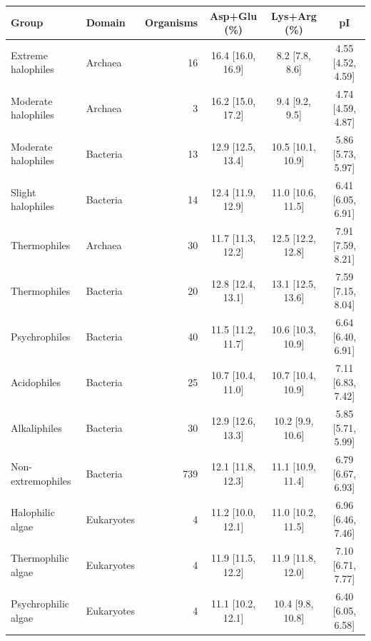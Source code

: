 \begin{tabular}{llrccc}
\hline
\textbf{Group} & \textbf{Domain} & \textbf{Organisms} & \textbf{Asp+Glu (\%)} & \textbf{Lys+Arg (\%)} & \textbf{pI} \\
\hline
Extreme halophiles & Archaea & 16 & 16.4 {\scriptsize[16.0, 16.9]} & 8.2 {\scriptsize[7.8, 8.6]} & 4.55 {\scriptsize[4.52, 4.59]} \\
Moderate halophiles & Archaea & 3 & 16.2 {\scriptsize[15.0, 17.2]} & 9.4 {\scriptsize[9.2, 9.5]} & 4.74 {\scriptsize[4.59, 4.87]} \\
Moderate halophiles & Bacteria & 13 & 12.9 {\scriptsize[12.5, 13.4]} & 10.5 {\scriptsize[10.1, 10.9]} & 5.86 {\scriptsize[5.73, 5.97]} \\
Slight halophiles & Bacteria & 14 & 12.4 {\scriptsize[11.9, 12.9]} & 11.0 {\scriptsize[10.6, 11.5]} & 6.41 {\scriptsize[6.05, 6.91]} \\
\hline
Thermophiles & Archaea & 30 & 11.7 {\scriptsize[11.3, 12.2]} & 12.5 {\scriptsize[12.2, 12.8]} & 7.91 {\scriptsize[7.59, 8.21]} \\
Thermophiles & Bacteria & 20 & 12.8 {\scriptsize[12.4, 13.1]} & 13.1 {\scriptsize[12.5, 13.6]} & 7.59 {\scriptsize[7.15, 8.04]} \\
Psychrophiles & Bacteria & 40 & 11.5 {\scriptsize[11.2, 11.7]} & 10.6 {\scriptsize[10.3, 10.9]} & 6.64 {\scriptsize[6.40, 6.91]} \\
Acidophiles & Bacteria & 25 & 10.7 {\scriptsize[10.4, 11.0]} & 10.7 {\scriptsize[10.4, 10.9]} & 7.11 {\scriptsize[6.83, 7.42]} \\
Alkaliphiles & Bacteria & 30 & 12.9 {\scriptsize[12.6, 13.3]} & 10.2 {\scriptsize[9.9, 10.6]} & 5.85 {\scriptsize[5.71, 5.99]} \\
Non-extremophiles & Bacteria & 739 & 12.1 {\scriptsize[11.8, 12.3]} & 11.1 {\scriptsize[10.9, 11.4]} & 6.79 {\scriptsize[6.67, 6.93]} \\
\hline
Halophilic algae & Eukaryotes & 4 & 11.2 {\scriptsize[10.0, 12.1]} & 11.0 {\scriptsize[10.2, 11.5]} & 6.96 {\scriptsize[6.46, 7.46]} \\
Thermophilic algae & Eukaryotes & 4 & 11.9 {\scriptsize[11.5, 12.2]} & 11.9 {\scriptsize[11.8, 12.0]} & 7.10 {\scriptsize[6.71, 7.77]} \\
Psychrophilic algae & Eukaryotes & 4 & 11.1 {\scriptsize[10.2, 12.1]} & 10.4 {\scriptsize[9.8, 10.8]} & 6.40 {\scriptsize[6.05, 6.58]} \\
\hline
\end{tabular}
